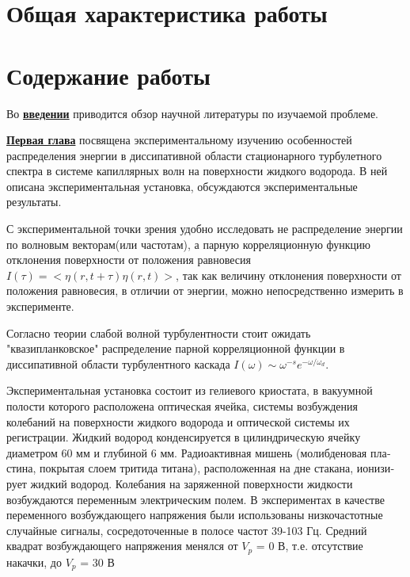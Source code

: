
\section*{Общая характеристика работы}

\newcommand{\actuality}{\underline{\textbf{\actualityTXT}}}
\newcommand{\progress}{\underline{\textbf{\progressTXT}}}
\newcommand{\aim}{\underline{{\textbf\aimTXT}}}
\newcommand{\tasks}{\underline{\textbf{\tasksTXT}}}
\newcommand{\novelty}{\underline{\textbf{\noveltyTXT}}}
\newcommand{\influence}{\underline{\textbf{\influenceTXT}}}
\newcommand{\methods}{\underline{\textbf{\methodsTXT}}}
\newcommand{\defpositions}{\underline{\textbf{\defpositionsTXT}}}
\newcommand{\reliability}{\underline{\textbf{\reliabilityTXT}}}
\newcommand{\probation}{\underline{\textbf{\probationTXT}}}
\newcommand{\contribution}{\underline{\textbf{\contributionTXT}}}
\newcommand{\publications}{\underline{\textbf{\publicationsTXT}}}

 

\section*{Содержание работы}
Во \underline{\textbf{введении}} приводится обзор научной литературы по изучаемой проблеме.

\underline{\textbf{Первая глава}} посвящена экспериментальному изучению особенностей распределения энергии в диссипативной области стационарного турбулетного спектра в системе капиллярных волн на поверхности жидкого водорода. В ней описана экспериментальная установка, обсуждаются экспериментальные результаты.

С экспериментальной точки зрения удобно исследовать не распределение энергии по волновым векторам(или частотам), а парную корреляционную функцию отклонения поверхности от положения равновесия $I(\tau)=<\eta(r, t+\tau)\eta(r,t)>$, так как величину отклонения поверхности от положения равновесия, в отличии от энергии, можно непосредственно измерить в эксперименте.

Согласно теории слабой волной турбулентности \cite{Ryzhenkova1990} стоит ожидать "квазипланковское"{} распределение парной корреляционной функции в диссипативной области турбулентного каскада $I(\omega) \sim \omega^{-s} e^{-\omega/\omega_d}$.

Экспериментальная установка состоит из гелиевого криостата, в вакуумной полости которого расположена оптическая ячейка, системы возбуждения колебаний на поверхности жидкого водорода и оптической системы их регистрации. Жидкий водород конденсируется в цилиндрическую ячейку диаметром 60 мм и глубиной 6 мм. Радиоактивная мишень (молибденовая пла­стина, покрытая слоем тритида титана), расположенная на дне стакана, ионизи­рует жидкий водород. Колебания на заряженной поверхности жидкости возбуждаются переменным электрическим полем. В экспериментах в качестве переменного возбуждающего напряжения были исполь­зованы низкочастотные случайные сигналы, сосредоточенные в полосе частот 39-103 Гц.  Средний квадрат возбуждающего напряжения менялся от $V_p$ = 0 В, т.е. отсутствие накачки, до $V_p$ = 30 В

